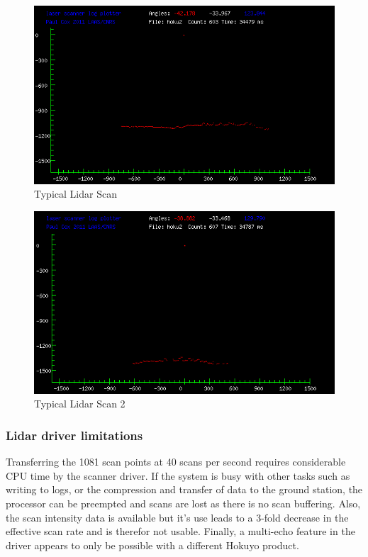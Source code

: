 \documentclass[a4paper,11pt]{report}
\begin{document}
\begin{figure}[ht]
 \centering
 \includegraphics[width=12cm]{scan603.png}
 \caption{Typical Lidar Scan}
 \label{fig:lidar_scan1}
\end{figure}

\begin{figure}[ht]
 \centering
 \includegraphics[width=12cm]{scan607.png}
 \caption{Typical Lidar Scan 2}
 \label{fig:lidar_scan2}
\end{figure}

\subsubsection{Lidar driver limitations}

Transferring the 1081 scan points at 40 scans per second requires considerable CPU time by the scanner driver. If the system is busy with other tasks such as writing to logs, or the compression and transfer of data to the ground station, the processor can be preempted and scans are lost as there is no scan buffering. Also, the scan intensity data is available but it's use leads to a 3-fold decrease in the effective scan rate and is therefor not usable. Finally, a multi-echo feature in the driver appears to only be possible with a different Hokuyo product.
\end{document}
